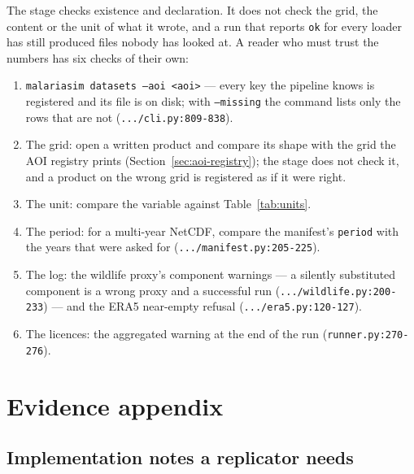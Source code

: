 \documentclass[11pt,a4paper]{article}
\newcommand{\code}[1]{\texttt{#1}}
\begin{document}
The stage checks existence and declaration. It does not check the grid, the
content or the unit of what it wrote, and a run that reports \code{ok} for
every loader has still produced files nobody has looked at. A reader who
must trust the numbers has six checks of their own:

\begin{enumerate}
\item \code{malariasim datasets --aoi <aoi>} --- every key the pipeline
knows is registered and its file is on disk; with \code{--missing} the
command lists only the rows that are not
(\code{.../cli.py:809-838}).
\item The grid: open a written product and compare its shape with the grid
the AOI registry prints (Section~\ref{sec:aoi-registry}); the stage does not
check it, and a product on the wrong grid is registered as if it were right.
\item The unit: compare the variable against Table~\ref{tab:units}.
\item The period: for a multi-year NetCDF, compare the manifest's
\code{period} with the years that were asked for
(\code{.../manifest.py:205-225}).
\item The log: the wildlife proxy's component warnings --- a silently
substituted component is a wrong proxy and a successful run
(\code{.../wildlife.py:200-233}) --- and the ERA5 near-empty refusal
(\code{.../era5.py:120-127}).
\item The licences: the aggregated warning at the end of the run
(\code{runner.py:270-276}).
\end{enumerate}

\section{Evidence appendix}

\subsection{Implementation notes a replicator needs}
\end{document}
